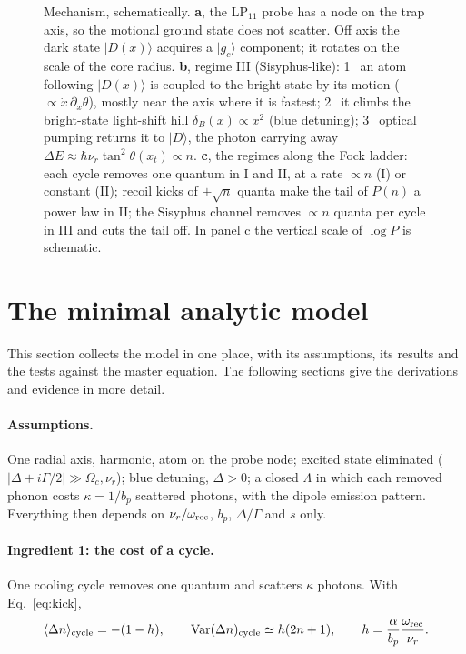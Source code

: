 \documentclass[11pt,a4paper]{article}
\newcommand{\ket}[1]{|#1\rangle}
\newcommand{\gc}{\ket{g_c}}
\newcommand{\Om}{\Omega}
\newcommand{\nur}{\nu_r}
\begin{document}
\begin{figure}[t]
\caption{Mechanism, schematically. \textbf{a}, the LP$_{11}$ probe has a node on the trap axis, so the motional ground state does not scatter. Off axis the dark state $\ket{D(x)}$ acquires a $\gc$ component; it rotates on the scale of the core radius. \textbf{b}, regime III (Sisyphus-like): \textcircled{\scriptsize 1}~an atom following $\ket{D(x)}$ is coupled to the bright state by its motion ($\propto\dot x\,\partial_x\theta$), mostly near the axis where it is fastest; \textcircled{\scriptsize 2}~it climbs the bright-state light-shift hill $\delta_B(x)\propto x^2$ (blue detuning); \textcircled{\scriptsize 3}~optical pumping returns it to $\ket D$, the photon carrying away $\Delta E\approx\hbar\nur\tan^2\theta(x_t)\propto n$. \textbf{c}, the regimes along the Fock ladder: each cycle removes one quantum in I and II, at a rate $\propto n$ (I) or constant (II); recoil kicks of $\pm\sqrt n$ quanta make the tail of $P(n)$ a power law in II; the Sisyphus channel removes $\propto n$ quanta per cycle in III and cuts the tail off. In panel c the vertical scale of $\log P$ is schematic.}
\label{fig:mechanism}
\end{figure}

\section{The minimal analytic model}
\label{sec:minimal}
This section collects the model in one place, with its assumptions, its results and the tests against the master equation. The following sections give the derivations and evidence in more detail.

\paragraph{Assumptions.} One radial axis, harmonic, atom on the probe node; excited state eliminated ($|\Delta+i\Gamma/2|\gg\Om_c,\nur$); blue detuning, $\Delta>0$; a closed $\Lambda$ in which each removed phonon costs $\kappa=1/b_p$ scattered photons, with the dipole emission pattern. Everything then depends on $\nur/\omega_{\rm rec}$, $b_p$, $\Delta/\Gamma$ and $s$ only.

\paragraph{Ingredient 1: the cost of a cycle.} One cooling cycle removes one quantum and scatters $\kappa$ photons. With Eq.~\eqref{eq:kick},
\begin{equation}
  \langle\Delta n\rangle_{\rm cycle}=-(1-h),\qquad {\rm Var}(\Delta n)_{\rm cycle}\simeq h(2n+1),\qquad h=\frac{\alpha}{b_p}\frac{\omega_{\rm rec}}{\nur}.
  \label{eq:min_cycle}
\end{equation}
\end{document}
